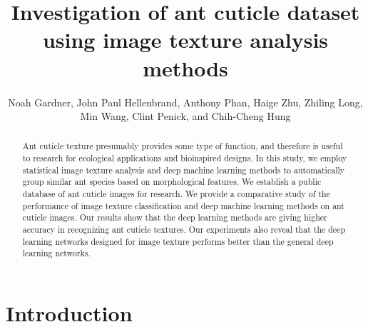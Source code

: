 \documentclass{aci}
\numberwithin{equation}{section}
\begin{document}
\title{Investigation of ant cuticle dataset using image texture
    analysis methods}

\author{%
    Noah Gardner,
    John Paul Hellenbrand,
    Anthony Phan,
    Haige Zhu,
    Zhiling Long,
    Min Wang,
    Clint Penick,
    and Chih-Cheng Hung\corrauth
}%


\address{%
}


\begin{abstract}
    Ant cuticle texture presumably provides some type of function, and therefore
    is useful to research for ecological applications and bioinspired designs.
    In this study, we employ statistical image texture analysis and deep machine
    learning methods to automatically group similar ant species based on
    morphological features. We establish a public database of ant cuticle images
    for research. We provide a comparative study of the performance of image
    texture classification and deep machine learning methods on ant cuticle
    images. Our results show that the deep learning methods are giving higher
    accuracy in recognizing ant cuticle textures. Our experiments also reveal
    that the deep learning networks designed for image texture performs better
    than the general deep learning networks.
\end{abstract}
\maketitle

\section{Introduction}
\end{document}
